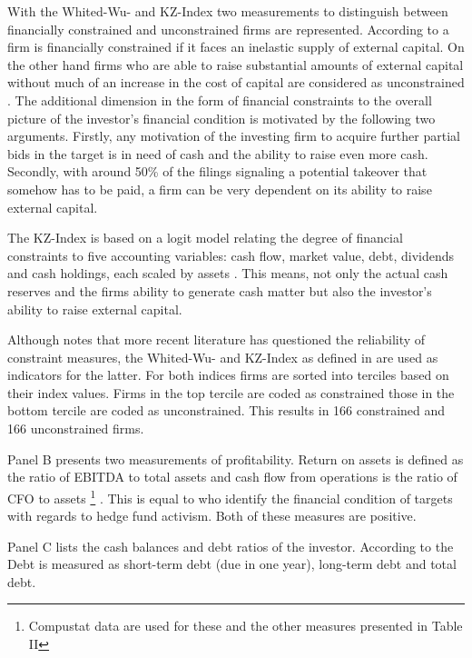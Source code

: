 \documentclass[12pt]{article}
\begin{document}
With the Whited-Wu- and KZ-Index two measurements to distinguish between financially constrained and unconstrained firms are represented. According to \citet[1]{Farre-mensa2013} a firm is financially constrained if it faces an inelastic supply of external capital. On the other hand firms who are able to raise substantial amounts of external capital without much of an increase in the cost of capital are considered as unconstrained \citep[p.1]{Farre-mensa2013}. 
The additional dimension in the form of financial constraints to the overall picture of the investor's financial condition is motivated by the following two arguments. Firstly, any motivation of the investing firm to acquire further partial bids in the target is in need of cash and the ability to raise even more cash. Secondly, with around 50\% of the filings signaling a potential takeover that somehow has to be paid, a firm can be very dependent on its ability to raise external capital.  

The KZ-Index is based on a logit model relating the degree of financial constraints to five accounting variables: cash flow, market value, debt, dividends and cash holdings, each scaled by assets \citep[p.5]{Farre-mensa2013}.  This means, not only the actual cash reserves and the firms ability to generate cash matter but also the investor's ability to raise external capital. 





Although \citet{Khatami2014} notes that more recent literature has questioned the reliability of constraint measures, the Whited-Wu- and KZ-Index as defined in \citet{Farre-mensa2013} are used as indicators for the latter. For both indices firms are sorted into terciles based on their index values. Firms in the top tercile are coded as constrained those in the bottom tercile are coded as unconstrained. This results in 166 constrained and 166 unconstrained firms. 

Panel B presents two measurements of profitability. Return on assets is defined as the ratio of EBITDA to total assets and cash flow from operations is the ratio of CFO to assets 
	\footnote{Compustat data are used for these and the other measures presented in Table II } 
. This is equal to \citet{Klein2009} who identify the financial condition of targets with regards to hedge fund activism. 
Both of these measures are positive. 

Panel C lists the cash balances and debt ratios of the investor. According to the 
Debt is measured as short-term debt (due in one year), long-term debt and total debt. 
\end{document}
